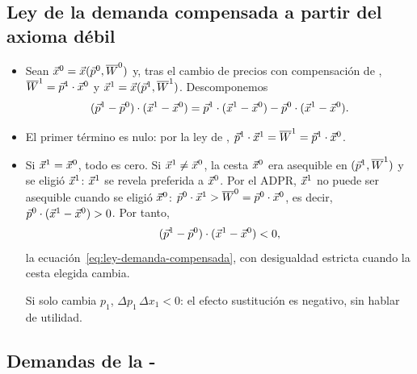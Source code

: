 \documentclass[11pt]{article}
\begin{document}
\subsection{Ley de la demanda compensada a partir del axioma débil}\label{der:adpr}

\begin{itemize}
\item Sean $\vec{x}^0=\vec{x}(\vec{p}^0,\overline{W}^0)$ y, tras el cambio de precios con compensación de , $\overline{W}^1=\vec{p}^1\cdot \vec{x}^0$ y $\vec{x}^1=\vec{x}(\vec{p}^1,\overline{W}^1)$\nocite{MasColellWhinstonGreen1995}. Descomponemos
  \begin{equation*}
  (\vec{p}^1-\vec{p}^0)\cdot(\vec{x}^1-\vec{x}^0)=\vec{p}^1\cdot(\vec{x}^1-\vec{x}^0)-\vec{p}^0\cdot(\vec{x}^1-\vec{x}^0).
  \end{equation*}
\item El primer término es nulo: por la ley de , $\vec{p}^1\cdot \vec{x}^1=\overline{W}^1=\vec{p}^1\cdot \vec{x}^0$.
\item Si $\vec{x}^1=\vec{x}^0$, todo es cero. Si $\vec{x}^1\neq \vec{x}^0$, la cesta $\vec{x}^0$ era asequible en $(\vec{p}^1,\overline{W}^1)$ y se eligió $\vec{x}^1$: $\vec{x}^1$ se revela preferida a $\vec{x}^0$. Por el ADPR, $\vec{x}^1$ no puede ser asequible cuando se eligió $\vec{x}^0$: $\vec{p}^0\cdot \vec{x}^1>\overline{W}^0=\vec{p}^0\cdot \vec{x}^0$, es decir, $\vec{p}^0\cdot(\vec{x}^1-\vec{x}^0)>0$. Por tanto,
  \begin{equation*}
  (\vec{p}^1-\vec{p}^0)\cdot(\vec{x}^1-\vec{x}^0)<0,
  \end{equation*}
  la ecuación~\eqref{eq:ley-demanda-compensada}, con desigualdad estricta cuando la cesta elegida cambia.\findemo

  Si solo cambia $p_1$, $\Delta p_1\,\Delta x_1<0$: el efecto sustitución es negativo, sin hablar de utilidad.
\end{itemize}

\subsection{Demandas de la -}\label{der:cobb-douglas}
\end{document}
